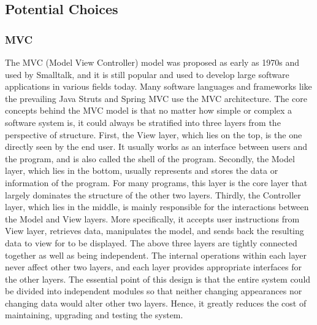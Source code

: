 \documentclass[letterpaper,10pt]{article}
\begin{document}
	\subsection{Potential Choices}
		\subsubsection{MVC}
        The MVC (Model View Controller) model was proposed as early as 1970s and used by Smalltalk, and it is still popular and used to develop large software applications in various fields today. Many software languages and frameworks like the prevailing Java Struts and Spring MVC use the MVC architecture. The core concepts behind the MVC model is that no matter how simple or complex a software system is, it could always be stratified into three layers from the perspective of structure. First, the View layer, which lies on the top, is the one directly seen by the end user. It usually works as an interface between users and the program, and is also called the shell of the program. Secondly, the Model layer, which lies in the bottom, usually represents and stores the data or information of the program. For many programs, this layer is the core layer that largely dominates the structure of the other two layers. Thirdly, the Controller layer, which lies in the middle, is mainly responsible for the interactions between the Model and View layers. More specifically, it accepts user instructions from View layer, retrieves data, manipulates the model, and sends back the resulting data to view for to be displayed. The above three layers are tightly connected together as well as being independent. The internal operations within each layer never affect other two layers, and each layer provides appropriate interfaces for the other layers. The essential point of this design is that the entire system could be divided into independent modules so that neither changing appearances nor changing data would alter other two layers. Hence, it greatly reduces the cost of maintaining, upgrading and testing the system.
\end{document}
